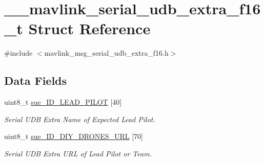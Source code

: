 \hypertarget{struct____mavlink__serial__udb__extra__f16__t}{\section{\+\_\+\+\_\+mavlink\+\_\+serial\+\_\+udb\+\_\+extra\+\_\+f16\+\_\+t Struct Reference}
\label{struct____mavlink__serial__udb__extra__f16__t}
}


{\ttfamily \#include $<$mavlink\+\_\+msg\+\_\+serial\+\_\+udb\+\_\+extra\+\_\+f16.\+h$>$}

\subsection*{Data Fields}
\begin{DoxyCompactItemize}
\item 
uint8\+\_\+t \hyperlink{struct____mavlink__serial__udb__extra__f16__t_a65082cfa195bb99e73f2b62187e6eaad}{sue\+\_\+\+I\+D\+\_\+\+L\+E\+A\+D\+\_\+\+P\+I\+L\+O\+T} \mbox{[}40\mbox{]}
\begin{DoxyCompactList}\small\item\em Serial U\+D\+B Extra Name of Expected Lead Pilot. \end{DoxyCompactList}\item 
uint8\+\_\+t \hyperlink{struct____mavlink__serial__udb__extra__f16__t_a1cb2ab0062a78bcd24e73da250f9756a}{sue\+\_\+\+I\+D\+\_\+\+D\+I\+Y\+\_\+\+D\+R\+O\+N\+E\+S\+\_\+\+U\+R\+L} \mbox{[}70\mbox{]}
\begin{DoxyCompactList}\small\item\em Serial U\+D\+B Extra U\+R\+L of Lead Pilot or Team. \end{DoxyCompactList}\end{DoxyCompactItemize}


